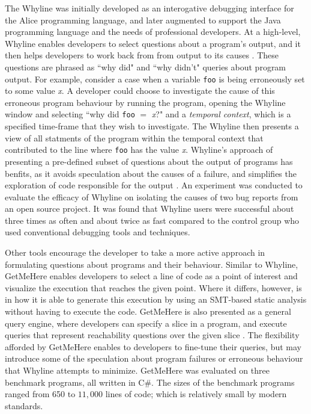 \par The Whyline was initially developed as an interogative debugging interface
for the Alice programming language, and later augmented to support the Java
programming language and the needs of professional developers.
At a high-level, Whyline enables developers to select questions about a
program's output, and it then helps developers to work back from from output
to its causes \cite{ko-2009-java-whyline}.
These questions are phrased as ``why did" and ``why didn't"
queries about program output.
For example, consider a case when a variable \texttt{foo} is being erroneously 
set to some value \textit{x}.
A developer could choose to investigate the cause of this erroneous program
behaviour by running the program, opening the Whyline window and selecting
``why did \texttt{foo} $=$ \textit{x}?" and a \emph{temporal context}, which is 
 a specified time-frame that they wish to investigate.
The Whyline then presents a view of all statments of the program within the
temporal context that contributed to the line where \texttt{foo} has the value
\textit{x}. 
Whyline's approach of presenting a pre-defined subset of questions about the 
output of programs has benfits, as it avoids speculation about the causes of
a failure, and simplifies the exploration of code responsible for the output
\cite{ko-2009-java-whyline}.
An experiment was conducted to evaluate the efficacy of Whyline on isolating the
causes of two bug reports from an open source project.
It was found that Whyline users were successful about three times as often
and about twice as fast compared to the control group who used conventional
debugging tools and techniques.

\par Other tools encourage the developer to take a more active approach in
formulating questions about programs and their behaviour.
Similar to Whyline, GetMeHere enables developers to select a line of code as a
point of interest and visualize the execution that reaches the given point.
Where it differs, however, is in how it is able to generate this execution
by using an SMT-based static analysis \cite{barnett-2014-get} without having to
execute the code.
GetMeHere is also presented as a general query engine, where developers can
specify a slice in a program, and execute queries that represent reachability
questions over the given slice \cite{barnett-2014-get}.
The flexibility afforded by GetMeHere enables to developers to fine-tune their
queries, but may introduce some of the speculation about program failures or
erroneous behaviour that Whyline attempts to minimize.
GetMeHere was evaluated on three benchmark programs, all written in C\#.
The sizes of the benchmark programs ranged from 650 to $11,000$ lines of code;
which is relatively small by modern standards.

